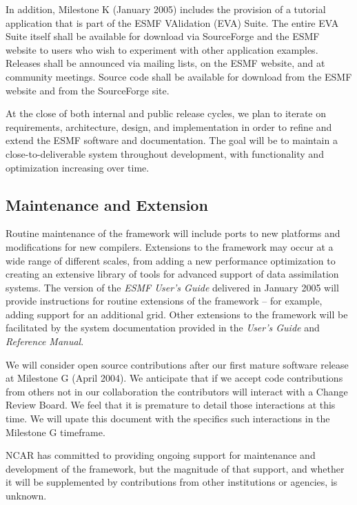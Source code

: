 In addition, Milestone K (January 2005) includes the provision of
a tutorial application that is part of the ESMF VAlidation (EVA) Suite.  The 
entire EVA Suite
itself shall be available for download via SourceForge and the ESMF 
website to users who wish to experiment with other application examples.  
Releases shall be announced via
mailing lists, on the ESMF website, and at community meetings.  Source
code shall be available for download from the ESMF website and from the 
SourceForge site.

At the close of both internal and public release cycles, we plan to 
iterate on requirements, architecture, design, and implementation in 
order to refine and extend the ESMF software and documentation.  The
goal will be to maintain a close-to-deliverable system throughout 
development, with functionality and optimization increasing
over time.

\subsection {Maintenance and Extension} 

Routine maintenance of the framework will include ports to new 
platforms and modifications for new compilers.  Extensions to the 
framework may occur at a wide range of different scales, from adding
a new performance optimization to creating an extensive library
of tools for advanced support of data assimilation systems.  
The version of the {\it ESMF User's Guide} delivered in 
January 2005 will provide instructions for routine extensions of 
the framework -- for example, adding support for an additional grid.
Other extensions to the framework will be facilitated by the system
documentation provided in the {\it User's Guide} and {\it Reference Manual}.  

We will consider open source contributions after our first mature 
software release at Milestone G (April 2004).  We anticipate that if we 
accept code contributions from others not in our collaboration the
contributors will interact with a Change Review Board.  We feel that
it is premature to detail those interactions at this time.  We will
upate this document with the specifics such interactions in the
Milestone G timeframe.

NCAR has committed to providing ongoing support for maintenance and 
development of the framework, but the magnitude of that support, and
whether it will be supplemented by contributions from other institutions
or agencies, is unknown.  











